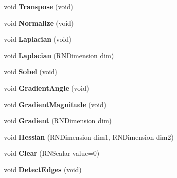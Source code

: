 \begin{DoxyCompactItemize}
\item 
void {\bfseries Transpose} (void)\hypertarget{class_r2_grid_a93a84bdfbf008e038b7d2a14f9c83923}{}\label{class_r2_grid_a93a84bdfbf008e038b7d2a14f9c83923}

\item 
void {\bfseries Normalize} (void)\hypertarget{class_r2_grid_ac39576558a8509cbd96cb373feab50f1}{}\label{class_r2_grid_ac39576558a8509cbd96cb373feab50f1}

\item 
void {\bfseries Laplacian} (void)\hypertarget{class_r2_grid_a4a810951ece1915e860751de691a93b1}{}\label{class_r2_grid_a4a810951ece1915e860751de691a93b1}

\item 
void {\bfseries Laplacian} (R\+N\+Dimension dim)\hypertarget{class_r2_grid_ac747e8a1da252ca6bbbe22bf8deac6ff}{}\label{class_r2_grid_ac747e8a1da252ca6bbbe22bf8deac6ff}

\item 
void {\bfseries Sobel} (void)\hypertarget{class_r2_grid_acc6dbe6f7b6c8685c7c1d1ae04cfff18}{}\label{class_r2_grid_acc6dbe6f7b6c8685c7c1d1ae04cfff18}

\item 
void {\bfseries Gradient\+Angle} (void)\hypertarget{class_r2_grid_a870983d53f0430255323072b4e9e3e68}{}\label{class_r2_grid_a870983d53f0430255323072b4e9e3e68}

\item 
void {\bfseries Gradient\+Magnitude} (void)\hypertarget{class_r2_grid_a08f6db8a58ee1a82542d4f35c057cfab}{}\label{class_r2_grid_a08f6db8a58ee1a82542d4f35c057cfab}

\item 
void {\bfseries Gradient} (R\+N\+Dimension dim)\hypertarget{class_r2_grid_a06afa5bd3409c01a5cd93c644ba206ad}{}\label{class_r2_grid_a06afa5bd3409c01a5cd93c644ba206ad}

\item 
void {\bfseries Hessian} (R\+N\+Dimension dim1, R\+N\+Dimension dim2)\hypertarget{class_r2_grid_ad889ddffd80f4fa1fb0f6e02c20b4fe2}{}\label{class_r2_grid_ad889ddffd80f4fa1fb0f6e02c20b4fe2}

\item 
void {\bfseries Clear} (R\+N\+Scalar value=0)\hypertarget{class_r2_grid_a2e5fd6336f4d4002cfd73bb443a77cb1}{}\label{class_r2_grid_a2e5fd6336f4d4002cfd73bb443a77cb1}

\item 
void {\bfseries Detect\+Edges} (void)\hypertarget{class_r2_grid_a3f00116a23b6a3d8faa0379bf9f4d3e0}{}\label{class_r2_grid_a3f00116a23b6a3d8faa0379bf9f4d3e0}


\end{DoxyCompactItemize}

